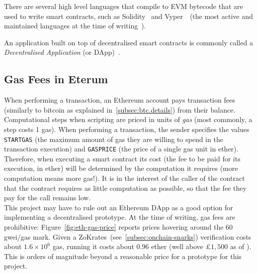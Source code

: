 There are several high level languages that compile to EVM bytecode that are used to write smart
contracts, such as Solidity~\cite{solidity_repo} and Vyper~\cite{vyper_repo}~(the most active and
maintained languages at the time of writing~\cite{eth_smartContractLangs}).


An application built on top of decentralised smart contracts is commonly called a
\textit{Decentralised Application} (or DApp)~\cite{masteringEthGlossary}.

\subsection{Gas Fees in Eterum}\label{subsec:eth:gas}

When performing a transaction, an Ethereum account pays transaction fees (similarly to bitcoin as
explained in~\ref{subsec:btc.details}) from their balance.
Computational steps when scripting are priced in units of \textit{gas} (most commonly, a step costs
1 gas).
When performing a transaction, the sender specifies the values \texttt{STARTGAS} (the maximum amount
of gas they are willing to spend in the transaction execution) and \texttt{GASPRICE} (the price of a
single gas unit in ether).\\

Therefore, when executing a smart contract its cost (the fee to be paid for its execution, in ether)
will be determined by the computation it requires (more computation means more gas!).
It is in the interest of the caller of the contract that the contract requires as little computation
as possible, so that the fee they pay for the call remains low.\\

This project may have to rule out an Ethereum DApp as a good option for implementing a decentralised
prototype.
At the time of writing, gas fees are prohibitive: Figure~\ref{fig:eth-gas-price} reports prices
hovering around the 60 gwei/gas mark.
Given a ZoKrates~(see~\ref{subsec:onchain-snarks}) verification costs about $1.6 \times 10^{6}$ gas,
running it costs about $0.96$ ether (well above £$1,500$ as of ).
This is orders of magnitude beyond a reasonable price for a prototype for this project.


